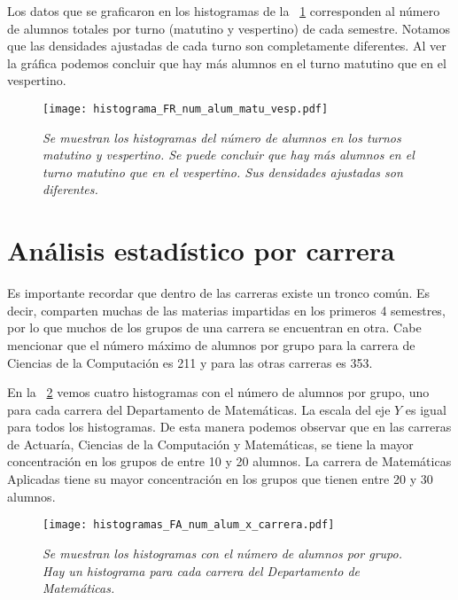 Los datos que se graficaron en los histogramas de la \figurename{~\ref{histNumAlTotal_MatuVesp}} corresponden al número de alumnos totales por turno (matutino y vespertino) de cada semestre. Notamos que las densidades ajustadas de cada turno son completamente diferentes. Al ver la gráfica podemos concluir que hay más alumnos en el turno matutino que en el vespertino.


\begin{figure}[h]
\centering
\texttt{[image: histograma\_FR\_num\_alum\_matu\_vesp.pdf]} %
\caption[\textit{Histogramas del número de alumnos en los turnos matutino y vespertino}]{\textit{Se muestran los histogramas del número de alumnos en los turnos matutino y vespertino. Se puede concluir que hay más alumnos en el turno matutino que en el vespertino. Sus densidades ajustadas son diferentes.}}\label{histNumAlTotal_MatuVesp}
\end{figure}


\section{Análisis estadístico por carrera}

Es importante recordar que dentro de las carreras existe un tronco común. Es decir, comparten muchas de las materias impartidas en los primeros 4 semestres, por lo que muchos de los grupos de una carrera se encuentran en otra. Cabe mencionar que el número máximo de alumnos por grupo para la carrera de Ciencias de la Computación es 211 y para las otras carreras es 353.

En la \figurename{~\ref{histFAnumAl_x_carrera}} vemos cuatro histogramas con el número de alumnos por grupo, uno para cada carrera del Departamento de Matemáticas. La escala del eje $Y$ es igual para todos los histogramas. De esta manera podemos observar que en las carreras de Actuaría, Ciencias de la Computación y Matemáticas, se tiene la mayor concentración en los grupos de entre 10 y 20 alumnos. La carrera de Matemáticas Aplicadas tiene su mayor concentración en los grupos que tienen entre 20 y 30 alumnos.

\begin{figure}[H]
\centering
\texttt{[image: histogramas\_FA\_num\_alum\_x\_carrera.pdf]} %
\caption[\textit{Histogramas del número de alumnos por carrera}]{\textit{Se muestran los histogramas con el número de alumnos por grupo. Hay un histograma para cada carrera del Departamento de Matemáticas.}}\label{histFAnumAl_x_carrera}
\end{figure}


